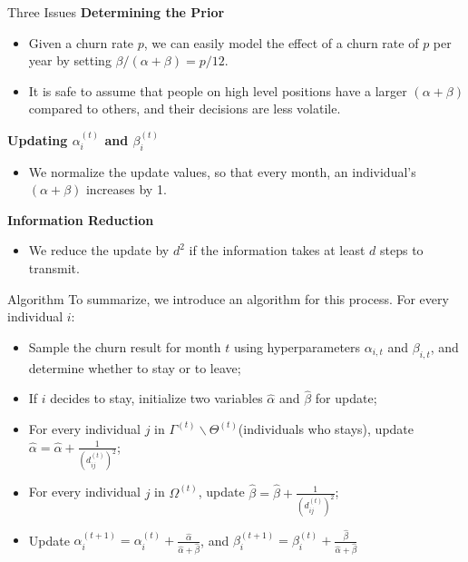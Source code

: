 \documentclass{beamer}
\begin{document}
\begin{frame}{Three Issues}
\textbf{Determining the Prior}
\begin{itemize}
\item Given a churn rate $p$, we can easily model the effect of a churn rate of $p$ per year by setting $\beta / (\alpha + \beta) = p / 12$.
\item It is safe to assume that people on high level positions have a larger $(\alpha+\beta)$ compared to others, and their decisions are less volatile.
\end{itemize}
 
\textbf{Updating $\alpha_i^{(t)}$ and $\beta_i^{(t)}$} 
\begin{itemize}
\item We normalize the update values, so that every month, an individual's $(\alpha+\beta)$ increases by 1.
\end{itemize}

\textbf{Information Reduction} 
\begin{itemize}
\item We reduce the update by $d^2$ if the information takes at least $d$ steps to transmit.
\end{itemize}

\end{frame}


\begin{frame}{Algorithm}
To summarize, we introduce an algorithm for this process. For every individual $i$:
\begin{itemize}
\item Sample the churn result for month $t$ using hyperparameters $\alpha_{i,t}$ and $\beta_{i,t}$, and determine whether to stay or to leave;
\item If $i$ decides to stay, initialize two variables $\hat{\alpha}$ and $\hat{\beta}$ for update;
\item For every individual $j$ in $\Gamma^{(t)} \backslash \Theta^{(t)}$(individuals who stays), update $\hat{\alpha} = \hat{\alpha} + \frac{1}{(d_{ij}^{(t)})^2}$;
\item For every individual $j$ in $\Omega^{(t)}$, update $ \hat{\beta} = \hat{\beta} + \frac{1}{(d_{ij}^{(t)})^2}$;
\item Update $ \alpha_{i}^{(t+1)}=\alpha_{i}^{(t)}+\frac{\hat{\alpha}}{\hat{\alpha}+\hat{\beta}}$, and $ \beta_{i}^{(t+1)}=\beta_{i}^{(t)}+\frac{\hat{\beta}}{\hat{\alpha}+\hat{\beta}}$
\end{itemize}
\end{frame}
\end{document}
